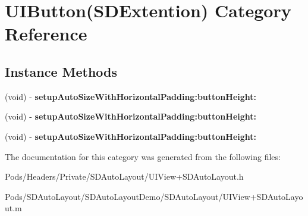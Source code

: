 \hypertarget{category_u_i_button_07_s_d_extention_08}{}\section{U\+I\+Button(S\+D\+Extention) Category Reference}
\label{category_u_i_button_07_s_d_extention_08}
\subsection*{Instance Methods}
\begin{DoxyCompactItemize}
\item 
\mbox{\label{category_u_i_button_07_s_d_extention_08_a0c599335ab75afce4a2bcb1ed92c46d1}} 
(void) -\/ {\bfseries setup\+Auto\+Size\+With\+Horizontal\+Padding\+:button\+Height\+:}
\item 
\mbox{\label{category_u_i_button_07_s_d_extention_08_a0c599335ab75afce4a2bcb1ed92c46d1}} 
(void) -\/ {\bfseries setup\+Auto\+Size\+With\+Horizontal\+Padding\+:button\+Height\+:}
\item 
\mbox{\label{category_u_i_button_07_s_d_extention_08_a0c599335ab75afce4a2bcb1ed92c46d1}} 
(void) -\/ {\bfseries setup\+Auto\+Size\+With\+Horizontal\+Padding\+:button\+Height\+:}
\end{DoxyCompactItemize}


The documentation for this category was generated from the following files\+:\begin{DoxyCompactItemize}
\item 
Pods/\+Headers/\+Private/\+S\+D\+Auto\+Layout/U\+I\+View+\+S\+D\+Auto\+Layout.\+h\item 
Pods/\+S\+D\+Auto\+Layout/\+S\+D\+Auto\+Layout\+Demo/\+S\+D\+Auto\+Layout/U\+I\+View+\+S\+D\+Auto\+Layout.\+m\end{DoxyCompactItemize}
